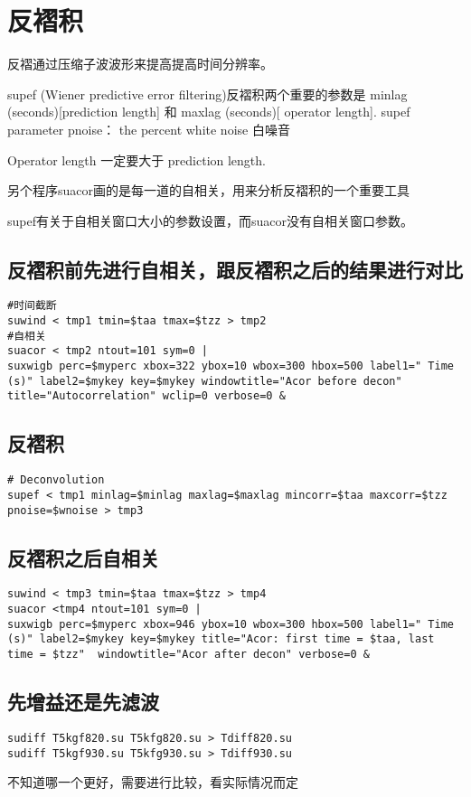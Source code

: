 \section{反褶积}
反褶通过压缩子波波形来提高提高时间分辨率。\par
supef (Wiener predictive error filtering)反褶积两个重要的参数是 minlag (seconds)[prediction length] 和 maxlag (seconds)[ operator length]. 
supef parameter pnoise： the percent white noise 白噪音\par
Operator length 一定要大于 prediction length.\par
另个程序suacor画的是每一道的自相关，用来分析反褶积的一个重要工具\par
supef有关于自相关窗口大小的参数设置，而suacor没有自相关窗口参数。\par

\subsection{反褶积前先进行自相关，跟反褶积之后的结果进行对比}
\begin{lstlisting}
#时间截断
suwind < tmp1 tmin=$taa tmax=$tzz > tmp2
#自相关
suacor < tmp2 ntout=101 sym=0 |
suxwigb perc=$myperc xbox=322 ybox=10 wbox=300 hbox=500 label1=" Time (s)" label2=$mykey key=$mykey windowtitle="Acor before decon" title="Autocorrelation" wclip=0 verbose=0 &
\end{lstlisting}

\subsection{反褶积}
\begin{lstlisting}
# Deconvolution
supef < tmp1 minlag=$minlag maxlag=$maxlag mincorr=$taa maxcorr=$tzz pnoise=$wnoise > tmp3
\end{lstlisting}

\subsection{反褶积之后自相关}
\begin{lstlisting}
suwind < tmp3 tmin=$taa tmax=$tzz > tmp4
suacor <tmp4 ntout=101 sym=0 |
suxwigb perc=$myperc xbox=946 ybox=10 wbox=300 hbox=500 label1=" Time (s)" label2=$mykey key=$mykey title="Acor: first time = $taa, last time = $tzz"  windowtitle="Acor after decon" verbose=0 &
\end{lstlisting}

\subsection{先增益还是先滤波}
\begin{lstlisting}
sudiff T5kgf820.su T5kfg820.su > Tdiff820.su
sudiff T5kgf930.su T5kfg930.su > Tdiff930.su
\end{lstlisting}
不知道哪一个更好，需要进行比较，看实际情况而定

